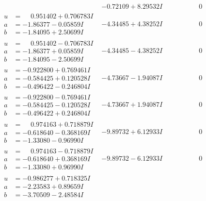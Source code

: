 \documentclass[1p]{elsarticle_modified}
\theoremstyle{definition}
\begin{document}
$$\begin{array}{c|c|c}
 & -0.72109 + 8.29532 I & \phantom{-0.000000 } 0 \\ \hline\begin{aligned}
u &= \phantom{-}0.951402 + 0.706783 I \\
a &= -1.86377 - 0.05859 I \\
b &= -1.84095 + 2.50699 I\end{aligned}
 & -4.34485 + 4.38252 I & \phantom{-0.000000 } 0 \\ \hline\begin{aligned}
u &= \phantom{-}0.951402 - 0.706783 I \\
a &= -1.86377 + 0.05859 I \\
b &= -1.84095 - 2.50699 I\end{aligned}
 & -4.34485 - 4.38252 I & \phantom{-0.000000 } 0 \\ \hline\begin{aligned}
u &= -0.922800 + 0.769461 I \\
a &= -0.584425 + 0.120528 I \\
b &= -0.496422 - 0.246804 I\end{aligned}
 & -4.73667 - 1.94087 I & \phantom{-0.000000 } 0 \\ \hline\begin{aligned}
u &= -0.922800 - 0.769461 I \\
a &= -0.584425 - 0.120528 I \\
b &= -0.496422 + 0.246804 I\end{aligned}
 & -4.73667 + 1.94087 I & \phantom{-0.000000 } 0 \\ \hline\begin{aligned}
u &= \phantom{-}0.974163 + 0.718879 I \\
a &= -0.618640 - 0.368169 I \\
b &= -1.33080 - 0.96990 I\end{aligned}
 & -9.89732 + 6.12933 I & \phantom{-0.000000 } 0 \\ \hline\begin{aligned}
u &= \phantom{-}0.974163 - 0.718879 I \\
a &= -0.618640 + 0.368169 I \\
b &= -1.33080 + 0.96990 I\end{aligned}
 & -9.89732 - 6.12933 I & \phantom{-0.000000 } 0 \\ \hline\begin{aligned}
u &= -0.986277 + 0.718325 I \\
a &= -2.23583 + 0.89659 I \\
b &= -3.70509 - 2.48584 I\end{aligned}

\end{array}$$
\end{document}
